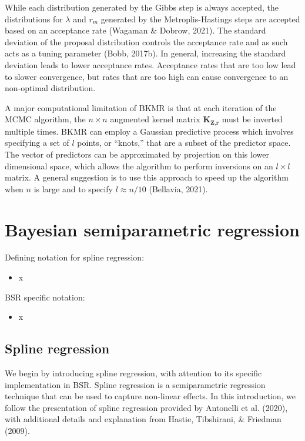 \documentclass[12pt, twoside]{amherstthesis}
\providecommand{\tightlist}{%
  \setlength{\itemsep}{0pt}\setlength{\parskip}{0pt}}
\begin{document}
While each distribution generated by the Gibbs step is always accepted, the distributions for \(\lambda\) and \(r_m\) generated by the Metroplis-Hastings steps are accepted based on an acceptance rate (Wagaman \& Dobrow, 2021). The standard deviation of the proposal distribution controls the acceptance rate and as such acts as a tuning parameter (Bobb, 2017b). In general, increasing the standard deviation leads to lower acceptance rates. Acceptance rates that are too low lead to slower convergence, but rates that are too high can cause convergence to an non-optimal distribution.

A major computational limitation of BKMR is that at each iteration of the MCMC algorithm, the \(n \times n\) augmented kernel matrix \(\textbf{K}_{\textbf{Z},\textbf{r}}\) must be inverted multiple times. BKMR can employ a Gaussian predictive process which involves specifying a set of \(l\) points, or ``knots,'' that are a subset of the predictor space. The vector of predictors can be approximated by projection on this lower dimensional space, which allows the algorithm to perform inversions on an \(l\times l\) matrix. A general suggestion is to use this approach to speed up the algorithm when \(n\) is large and to specify \(l\approx n/10\) (Bellavia, 2021).

\hypertarget{bsr}{%
\section{Bayesian semiparametric regression}\label{bsr}}

Defining notation for spline regression:
\begin{itemize}
\tightlist
\item
  x
\end{itemize}
BSR specific notation:
\begin{itemize}
\tightlist
\item
  x
\end{itemize}
\hypertarget{spline-regression}{%
\subsection{Spline regression}\label{spline-regression}}

We begin by introducing spline regression, with attention to its specific implementation in BSR. Spline regression is a semiparametric regression technique that can be used to capture non-linear effects. In this introduction, we follow the presentation of spline regression provided by Antonelli et al. (2020), with additional details and explanation from Hastie, Tibshirani, \& Friedman (2009).
\end{document}
